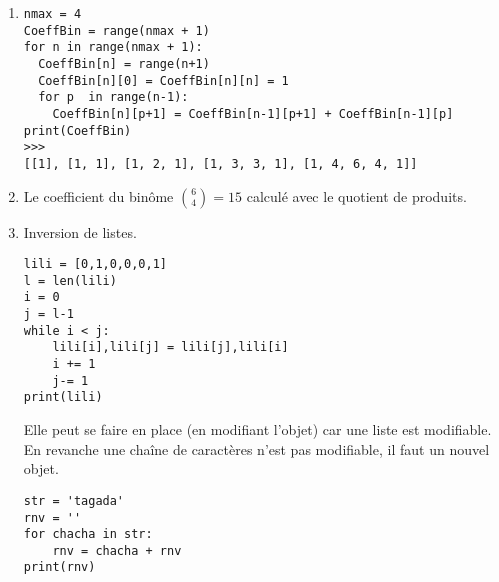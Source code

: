 \begin{enumerate}
  \item 
 
\begin{verbatim}
nmax = 4
CoeffBin = range(nmax + 1)
for n in range(nmax + 1):
  CoeffBin[n] = range(n+1)
  CoeffBin[n][0] = CoeffBin[n][n] = 1
  for p  in range(n-1):
    CoeffBin[n][p+1] = CoeffBin[n-1][p+1] + CoeffBin[n-1][p]  
print(CoeffBin)
>>> 
[[1], [1, 1], [1, 2, 1], [1, 3, 3, 1], [1, 4, 6, 4, 1]]\end{verbatim}

  \item Le coefficient du binôme $\binom{6}{4}=15$ calculé avec le quotient de produits.

  \item Inversion de listes.
\begin{verbatim}lili = [0,1,0,0,0,1]
l = len(lili)
i = 0
j = l-1
while i < j:
    lili[i],lili[j] = lili[j],lili[i]
    i += 1
    j-= 1
print(lili)\end{verbatim}
Elle peut se faire en place (en modifiant l'objet) car une liste est modifiable.\newline
En revanche une chaîne de caractères n'est pas modifiable, il faut un nouvel objet.
\begin{verbatim}str = 'tagada'
rnv = ''
for chacha in str:
    rnv = chacha + rnv
print(rnv)\end{verbatim}

\end{enumerate}
